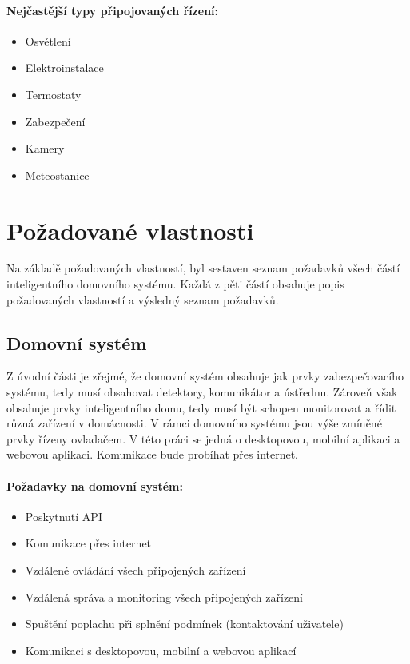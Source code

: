 \documentclass[FM,DP]{tulthesis}  %
\begin{document}
\paragraph{Nejčastější typy připojovaných řízení:}
\begin{itemize}
\item Osvětlení
\item Elektroinstalace
\item Termostaty
\item Zabezpečení
\item Kamery
\item Meteostanice
\end{itemize}


\section{Požadované vlastnosti}
Na základě požadovaných vlastností, byl sestaven seznam požadavků všech částí inteligentního domovního systému. Každá z pěti částí obsahuje popis požadovaných vlastností a výsledný seznam požadavků.

\subsection{Domovní systém}
Z úvodní části je zřejmé, že domovní systém obsahuje jak prvky zabezpečovacího systému, tedy musí obsahovat detektory, komunikátor a ústřednu. Zároveň však obsahuje prvky inteligentního domu, tedy musí být schopen monitorovat a řídit různá zařízení v domácnosti. V rámci domovního systému jsou výše zmíněné prvky řízeny ovladačem. V této práci se jedná o desktopovou, mobilní aplikaci a webovou aplikaci. Komunikace bude probíhat přes internet.

\paragraph{Požadavky na domovní systém:}
\begin{itemize}
\item Poskytnutí API
\item Komunikace přes internet
\item Vzdálené ovládání všech připojených zařízení
\item Vzdálená správa a monitoring všech připojených zařízení
\item Spuštění poplachu při splnění podmínek (kontaktování uživatele)
\item Komunikaci s desktopovou, mobilní a webovou aplikací
\end{itemize}
\end{document}
